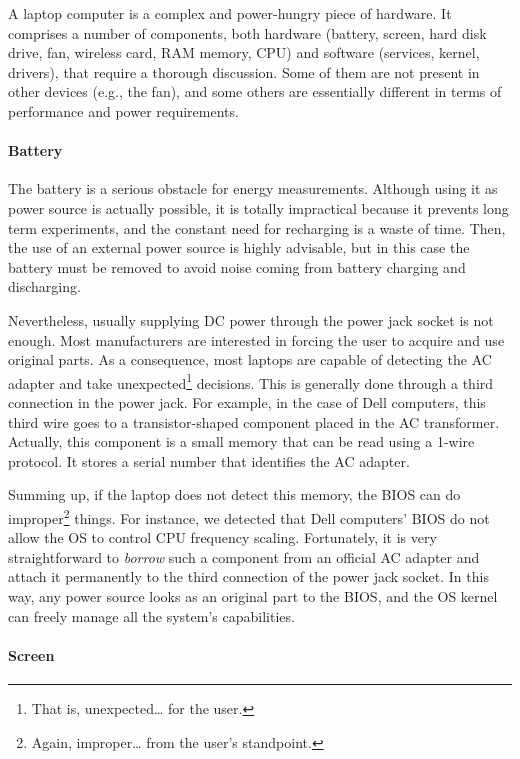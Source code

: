 \documentclass[twoside,nohyper]{tufte-book}
\begin{document}
A laptop computer is a complex and power-hungry piece of hardware. It comprises a number of components, both hardware (battery, screen, hard disk drive, fan, wireless card, RAM memory, CPU) and software (services, kernel, drivers), that require a thorough discussion. Some of them are not present in other devices (e.g., the fan), and some others are essentially different in terms of performance and power requirements.

\hypertarget{battery}{%
\paragraph{Battery}\label{battery}}

The battery is a serious obstacle for energy measurements. Although using it as power source is actually possible, it is totally impractical because it prevents long term experiments, and the constant need for recharging is a waste of time. Then, the use of an external power source is highly advisable, but in this case the battery must be removed to avoid noise coming from battery charging and discharging.

Nevertheless, usually supplying DC power through the power jack socket is not enough. Most manufacturers are interested in forcing the user to acquire and use original parts. As a consequence, most laptops are capable of detecting the AC adapter and take unexpected\footnote{That is, unexpected\ldots{} for the user.} decisions. This is generally done through a third connection in the power jack. For example, in the case of Dell computers, this third wire goes to a transistor-shaped component placed in the AC transformer. Actually, this component is a small memory that can be read using a 1-wire protocol. It stores a serial number that identifies the AC adapter.

Summing up, if the laptop does not detect this memory, the BIOS can do improper\footnote{Again, improper\ldots{} from the user's standpoint.} things. For instance, we detected that Dell computers' BIOS do not allow the OS to control CPU frequency scaling. Fortunately, it is very straightforward to \emph{borrow} such a component from an official AC adapter and attach it permanently to the third connection of the power jack socket. In this way, any power source looks as an original part to the BIOS, and the OS kernel can freely manage all the system's capabilities.

\hypertarget{screen}{%
\paragraph{Screen}\label{screen}}
\end{document}
